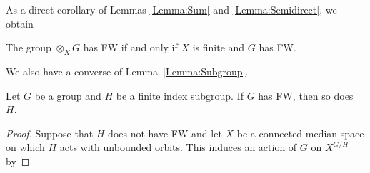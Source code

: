 As a direct corollary of Lemmas \ref{Lemma:Sum} and \ref{Lemma:Semidirect}, we obtain
\begin{cor}\label{Cor:Sum}
The group $\otimes_X G$ has FW if and only if $X$ is finite and $G$ has FW.
\end{cor}


We also have a converse of Lemma~\ref{Lemma:Subgroup}.
\begin{lem}\label{Lemma:Subgroup2}
Let $G$ be a group and $H$ be a finite index subgroup.
If $G$ has FW, then so does~$H$.
\end{lem}
\begin{proof}
Suppose that $H$ does not have FW and let $X$ be a connected median space on which $H$ acts with unbounded orbits.
This induces an action of $G$ on $X^{G/H}$ by
\end{proof}







